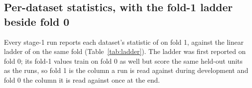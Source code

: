 \subsection{Per-dataset statistics, with the fold-1 ladder beside fold 0}
\label{sec:perdataset}

Every stage-1 run reports each dataset's statistic of  on fold 1, against the
linear ladder of  on the same fold
(Table~\ref{tab:ladder}). The ladder was first reported on fold 0; its fold-1 values train on
fold 0 as well but score the same held-out units as the runs, so fold 1 is the column a run is
read against during development and fold 0 the column it is read against once at the end.

\begingroup
\footnotesize
\setlength{\tabcolsep}{3pt}
